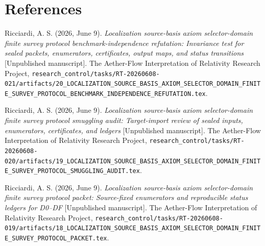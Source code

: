 \documentclass[11pt]{article}
\begin{document}
\section*{References}

Ricciardi, A. S. (2026, June 9). \emph{Localization source-basis axiom
selector-domain finite survey protocol benchmark-independence refutation:
Invariance test for sealed packets, enumerators, certificates, output maps,
and status transitions} [Unpublished manuscript]. The Aether-Flow
Interpretation of Relativity Research Project,
\texttt{research\_control/tasks/RT-20260608-021/artifacts/20\_LOCALIZATION\_SOURCE\_BASIS\_AXIOM\_SELECTOR\_DOMAIN\_FINITE\_SURVEY\_PROTOCOL\_BENCHMARK\_INDEPENDENCE\_REFUTATION.tex}.

Ricciardi, A. S. (2026, June 9). \emph{Localization source-basis axiom
selector-domain finite survey protocol smuggling audit: Target-import review
of sealed inputs, enumerators, certificates, and ledgers} [Unpublished
manuscript]. The Aether-Flow Interpretation of Relativity Research Project,
\texttt{research\_control/tasks/RT-20260608-020/artifacts/19\_LOCALIZATION\_SOURCE\_BASIS\_AXIOM\_SELECTOR\_DOMAIN\_FINITE\_SURVEY\_PROTOCOL\_SMUGGLING\_AUDIT.tex}.

Ricciardi, A. S. (2026, June 9). \emph{Localization source-basis axiom
selector-domain finite survey protocol packet: Source-fixed enumerators and
reproducible status ledgers for D0--DF} [Unpublished manuscript]. The
Aether-Flow Interpretation of Relativity Research Project,
\texttt{research\_control/tasks/RT-20260608-019/artifacts/18\_LOCALIZATION\_SOURCE\_BASIS\_AXIOM\_SELECTOR\_DOMAIN\_FINITE\_SURVEY\_PROTOCOL\_PACKET.tex}.
\end{document}
